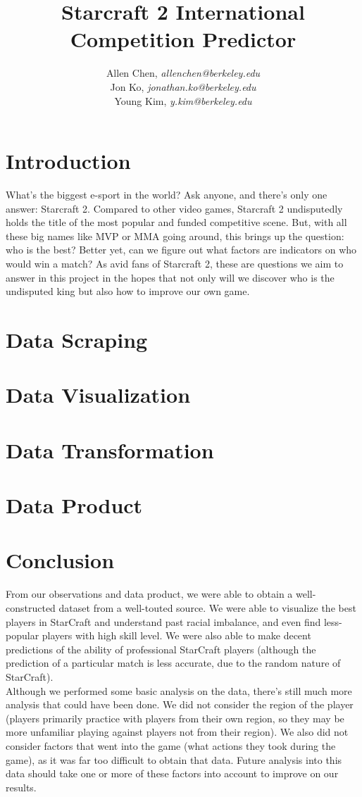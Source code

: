 \documentclass[10pt]{handout}
\author{
  Allen Chen, \emph{allenchen@berkeley.edu}\\
  Jon Ko, \emph{jonathan.ko@berkeley.edu}\\
  Young Kim, \emph{y.kim@berkeley.edu}\\
}
\title{Starcraft 2 International Competition Predictor}
\begin{document}
\maketitle

\section{Introduction}
What's the biggest e-sport in the world? Ask anyone, and there's only one answer: Starcraft 2. Compared to other video games, Starcraft 2 undisputedly holds the title of the most popular and funded competitive scene. But, with all these big names like MVP or MMA going around, this brings up the question: who is the best? Better yet, can we figure out what factors are indicators on who would win a match? As avid fans of Starcraft 2, these are questions we aim to answer in this project in the hopes that not only will we discover who is the undisputed king but also how to improve our own game.

\section{Data Scraping}


\section{Data Visualization}


\section{Data Transformation}


\section{Data Product}


\section{Conclusion}
From our observations and data product, we were able to obtain a well-constructed dataset from a well-touted source.  We were able to visualize the best players in StarCraft and understand past racial imbalance, and even find less-popular players with high skill level.  We were also able to make decent predictions of the ability of professional StarCraft players (although the prediction of a particular match is less accurate, due to the random nature of StarCraft).\\
Although we performed some basic analysis on the data, there's still much more analysis that could have been done.  We did not consider the region of the player (players primarily practice with players from their own region, so they may be more unfamiliar playing against players not from their region).  We also did not consider factors that went into the game (what actions they took during the game), as it was far too difficult to obtain that data.  Future analysis into this data should take one or more of these factors into account to improve on our results.
\end{document}
